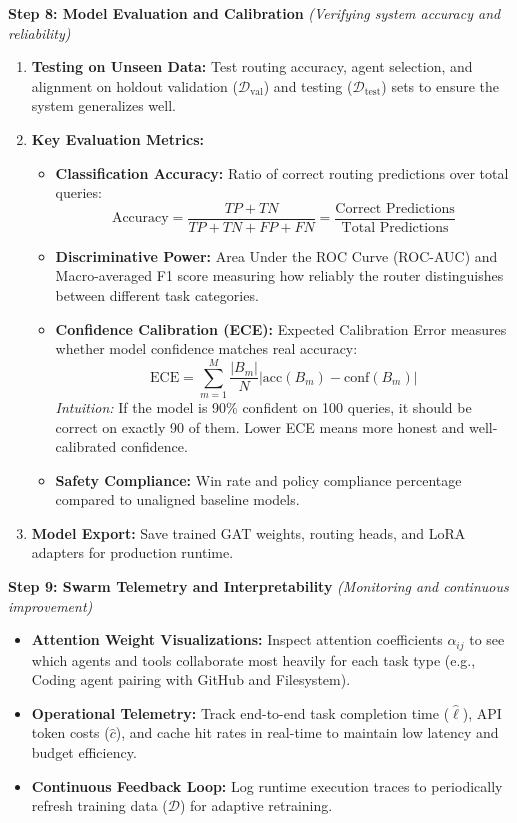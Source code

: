 \documentclass[11pt,a4paper]{article}
\begin{document}
\textbf{Step 8: Model Evaluation and Calibration} \emph{(Verifying system accuracy and reliability)}
\begin{enumerate}[leftmargin=1.5em, itemsep=0.25em, topsep=0.08em]
    \item \textbf{Testing on Unseen Data:} Test routing accuracy, agent selection, and alignment on holdout validation ($\mathcal{D}_{\text{val}}$) and testing ($\mathcal{D}_{\text{test}}$) sets to ensure the system generalizes well.
    \item \textbf{Key Evaluation Metrics:}
    \begin{itemize}[leftmargin=1.2em, itemsep=0.18em, topsep=0.05em]
        \item \textbf{Classification Accuracy:} Ratio of correct routing predictions over total queries:
        \[
        \mathrm{Accuracy} = \frac{TP + TN}{TP + TN + FP + FN} = \frac{\text{Correct Predictions}}{\text{Total Predictions}}
        \]
        \item \textbf{Discriminative Power:} Area Under the ROC Curve (ROC-AUC) and Macro-averaged F1 score measuring how reliably the router distinguishes between different task categories.
        \item \textbf{Confidence Calibration (ECE):} Expected Calibration Error measures whether model confidence matches real accuracy:
        \[
        \mathrm{ECE} = \sum_{m=1}^M \frac{|B_m|}{N} \left| \mathrm{acc}(B_m) - \mathrm{conf}(B_m) \right|
        \]
        \emph{Intuition:} If the model is 90\% confident on 100 queries, it should be correct on exactly 90 of them. Lower ECE means more honest and well-calibrated confidence.
        \item \textbf{Safety Compliance:} Win rate and policy compliance percentage compared to unaligned baseline models.
    \end{itemize}
    \item \textbf{Model Export:} Save trained GAT weights, routing heads, and LoRA adapters for production runtime.
\end{enumerate}

\vspace{0.5em}
\textbf{Step 9: Swarm Telemetry and Interpretability} \emph{(Monitoring and continuous improvement)}
\begin{itemize}[leftmargin=1.5em, itemsep=0.24em, topsep=0.06em]
    \item \textbf{Attention Weight Visualizations:} Inspect attention coefficients $\alpha_{ij}$ to see which agents and tools collaborate most heavily for each task type (e.g., Coding agent pairing with GitHub and Filesystem).
    \item \textbf{Operational Telemetry:} Track end-to-end task completion time ($\hat{\ell}$), API token costs ($\hat{c}$), and cache hit rates in real-time to maintain low latency and budget efficiency.
    \item \textbf{Continuous Feedback Loop:} Log runtime execution traces to periodically refresh training data ($\mathcal{D}$) for adaptive retraining.
\end{itemize}
\end{document}
